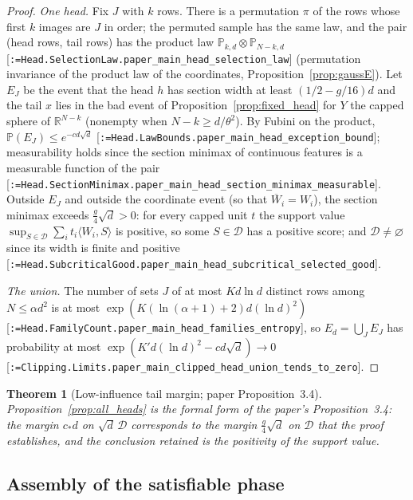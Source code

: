 \documentclass[11pt]{article}
\makeatletter
\newcommand{\formal@break}[1]{\@tfor\formal@tok:=#1\do{%
  \formal@tok
  \expandafter\ifx\formal@tok.\allowbreak\else
  \expandafter\ifx\formal@tok\_\allowbreak\fi\fi}}
\DeclareRobustCommand{\formal}[1]{\textnormal{[\texttt{\small\formal@break{#1}}]}}
\newcommand{\R}{\mathbb{R}}
\newcommand{\Prob}{\mathbb{P}}
\newcommand{\ip}[2]{\langle #1, #2\rangle}
\newcommand{\sqd}{\sqrt{d}}
\theoremstyle{plain}
\newtheorem{theorem}{Theorem}[section]
\theoremstyle{definition}
\makeatother
\begin{document}
\begin{proof}
\emph{One head.} Fix $J$ with $k$ rows. There is a permutation $\pi$ of the
rows whose first $k$ images are $J$ in order; the permuted sample has the
same law, and the pair (head rows, tail rows) has the product law
$\Prob_{k,d}\otimes\Prob_{N-k,d}$ \formal{Head.SelectionLaw.paper\_main\_head\_selection\_law}
(permutation invariance of the product law of the coordinates,
Proposition~\ref{prop:gaussE}). Let $E_J$ be the event that the head $h$
has section width at least $(1/2 - g/16)d$ and the tail $x$ lies in the
bad event of Proposition~\ref{prop:fixed_head} for $Y$ the capped sphere of
$\R^{N-k}$ (nonempty when $N - k \ge d/\theta^2$). By Fubini on the product,
$\Prob(E_J) \le e^{-cd\sqd}$ \formal{Head.LawBounds.paper\_main\_head\_exception\_bound};
measurability holds since the section minimax of continuous features is a
measurable function of the pair \formal{Head.SectionMinimax.paper\_main\_head\_section\_minimax\_measurable}.
Outside $E_J$ and outside the coordinate event (so that $\overline W_i = W_i$),
the section minimax exceeds $\frac g4\sqd > 0$: for every capped unit $t$
the support value $\sup_{S\in\mathcal{D}}\sum_it_i\ip{W_i}{S}$ is positive,
so some $S \in \mathcal{D}$ has a positive score; and $\mathcal{D} \ne \varnothing$
since its width is finite and positive \formal{Head.SubcriticalGood.paper\_main\_head\_subcritical\_selected\_good}.

\emph{The union.} The number of sets $J$ of at most $Kd\ln d$ distinct rows
among $N \le \alpha d^2$ is at most $\exp(K(\ln(\alpha + 1) + 2)d(\ln d)^2)$
\formal{Head.FamilyCount.paper\_main\_head\_families\_entropy}, so
$E_d = \bigcup_JE_J$ has probability at most
$\exp(K'd(\ln d)^2 - cd\sqd) \to 0$ \formal{Clipping.Limits.paper\_main\_clipped\_head\_union\_tends\_to\_zero}.
\end{proof}

\begin{theorem}[Low-influence tail margin; paper Proposition~3.4]\label{thm:lowinf}
Proposition~\ref{prop:all_heads} is the formal form of the paper's
Proposition~3.4: the margin $c_*d$ on $\sqd\,\mathcal{D}$ corresponds to
the margin $\frac g4\sqd$ on $\mathcal{D}$ that the proof establishes, and
the conclusion retained is the positivity of the support value.
\end{theorem}

\subsection{Assembly of the satisfiable phase}
\end{document}

